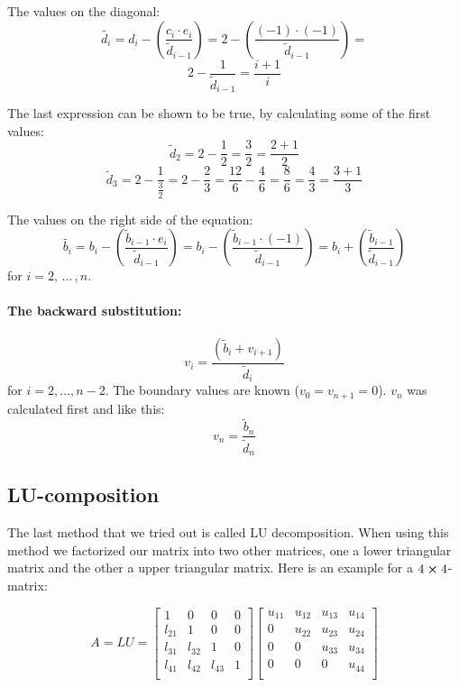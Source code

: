 \hspace{1cm}\linebreak
The values on the diagonal:
\[
\tilde{d_i} =  d_i - \left(\frac{c_i \cdot e_i}{\tilde{d}_{i-1}}\right) = 2 - \left(\frac{(-1) \cdot (-1)}{\tilde{d}_{i-1}}\right) = 
\]
\[
2 - \frac{1}{\tilde{d}_{i-1}} =  \frac{i + 1}{i}
\]

The last expression can be shown to be true, by calculating some of the first values:
\[
\tilde{d}_2 = 2 - \frac{1}{2} = \frac{3}{2} = \frac{2 + 1}{2}
\]
\[
\tilde{d}_3 = 2 - \frac{1}{\frac{3}{2}} = 2 - \frac{2}{3} = \frac{12}{6} - \frac{4}{6} = \frac{8}{6} = \frac{4}{3} = \frac{3+1}{3}
\]

The values on the right side of the equation:
\[
\tilde{b_i} =  b_i - \left(\frac{\tilde{b}_{i-1} \cdot e_i}{\tilde{d}_{i-1}}\right) = b_i - \left(\frac{\tilde{b}_{i-1} \cdot (-1)}{\tilde{d}_{i-1}}\right) = b_i + \left(\frac{\tilde{b}_{i-1}}{\tilde{d}_{i-1}}\right)
\]
for $i = 2,\, \dots\, , n $.

\paragraph{The backward substitution:\hspace{4cm}}

\hspace{1cm}\linebreak
\[
v_i = \frac{\left(\tilde{b}_i + v_{i+1}\right)}{\tilde{d}_i}
\]
for $i = 2, \dots, n-2 $. The boundary values are known ($v_0 = v_{n+1} = 0$). $v_{n}$ was calculated first and like this:
\[
v_{n} = \frac{\tilde{b}_{n}}{\tilde{d}_{n}}
\]

\subsection{LU-composition}


The last method that we tried out is called LU decomposition. When using this method we factorized our matrix into two other matrices, one a lower triangular matrix and the other a upper triangular matrix. Here is an example for a $ 4 \cross 4$-matrix:

\[
A = LU = 
    \begin{bmatrix}
    	1& 0& 0 & 0 \\
        l_{21} & 1 & 0 &0\\
        l_{31}&l_{32} & 1 & 0 \\
        l_{41} & l_{42} & l_{43} & 1\\
        \end{bmatrix}
    \begin{bmatrix}
    	u_{11}& u_{12}& u_{13} &u_{14} \\
        0 & u_{22} & u_{23} &u_{24}\\
        0& 0  &u_{33} & u_{34} \\
        0&0 & 0 & u_{44}\\
        \end{bmatrix}
\]

